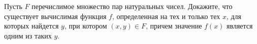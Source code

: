 Пусть $F$ перечислимое множество пар натуральных чисел. Докажите, что существует вычислимая функция $f$, определенная на тех
и только тех $x$, для которых найдется $y$, при котором $(x, y) \in F$, причем значение $f(x)$ является одним из таких $y$.